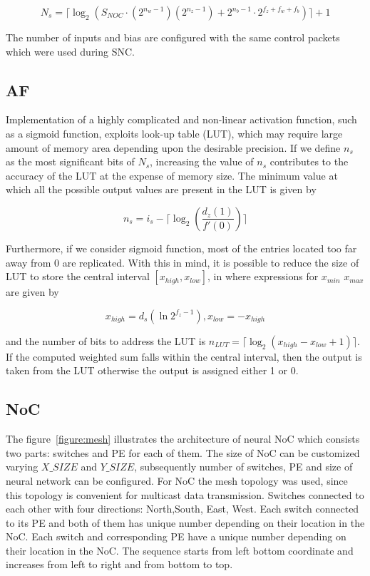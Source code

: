 \begin{equation}
N_{s}=\lceil\log_{2}(S_{NOC}\cdot (2^{n_{w}-1})(2^{n_{z}-1})+2^{n_{b}-1}\cdot 2^{f_{z}+f_{w}+f_{b}})\rceil+1
\label{equation:Ns}
\end{equation}

The number of inputs and bias are configured with the same control packets which were used during SNC.  

\subsection{AF}
Implementation of a highly complicated and non-linear activation function, such as a sigmoid function, exploits look-up table (LUT), which may require large amount of memory area depending upon the desirable precision.  If we define $n_{s}$ as the most significant bits of $N_{s}$, increasing the value of $n_{s}$ contributes to the accuracy of the LUT at the expense of memory size. The minimum value at which all the possible output values are present in the LUT is given by

\begin{equation}
n_{s}=i_{s}-\lceil\log_{2}(\frac{d_{z}(1)}{{f}'(0)})\rceil
\label{equation:ns}
\end{equation}

Furthermore, if we consider sigmoid function, most of the entries located too far away from 0 are replicated. With this in mind, it is possible to reduce the size of LUT to store the central interval $[x_{high}, x_{low}]$, in where expressions for $x_{min}$ $x_{max}$ are given by

\begin{equation}
x_{high}=d_{s}(\ln{2^{f_{z}-1}}), x_{low}=-x_{high}
\label{equation:interval}
\end{equation}

and the number of bits to address the LUT is 
$n_{LUT}=\lceil\log_{2}{(x_{high}-x_{low}+1)}\rceil$.
If the computed weighted sum falls within the central interval, then the output is taken from the LUT otherwise the output is assigned either 1 or 0. 


\subsection{NoC}
The figure~\ref{figure:mesh} illustrates the architecture of neural NoC which consists two parts: switches and PE for each of them. The size of NoC can be customized varying $X\_SIZE$ and $Y\_SIZE$,  subsequently number of switches, PE and size of neural network can be configured. For NoC the mesh topology was used, since this topology is convenient for multicast data transmission. Switches connected to each other with four directions: North,South, East, West. Each switch connected to its PE and both of them has unique number depending on their location in the NoC. Each switch and corresponding PE have a unique number depending on their location in the NoC. The sequence starts from left bottom coordinate and increases from left to right and from bottom to top. 

